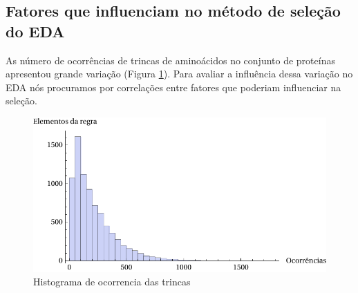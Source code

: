 




\subsection{Fatores que influenciam no método de seleção do EDA}

As número de ocorrências de trincas de aminoácidos no conjunto de proteínas apresentou grande variação (Figura \ref{fig:histograma_occ}). Para avaliar a influência dessa variação no EDA nós procuramos por correlações entre fatores que poderiam influenciar na seleção.

\begin{figure}
  \centering
  \includegraphics[width=1\textwidth]{figures/histograma_occ.pdf}
  \caption{Histograma de ocorrencia das trincas}
        \label{fig:histograma_occ}
\end{figure}


